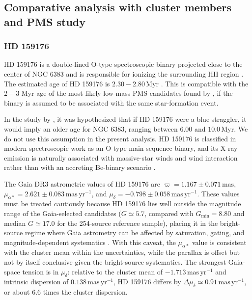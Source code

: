 \documentclass{aa}
\begin{document}
\subsection{Comparative analysis with cluster members and PMS study}
\subsubsection{HD 159176}
HD 159176 is a double-lined O-type spectroscopic binary projected close to the center of NGC 6383 and is responsible for ionizing the surrounding HII region \citep{1993Obs...113..204S,2007A&A...474..193L,2016ApJ...832..211P}. The estimated age of HD 159176 is $2.30-2.80$\,Myr \citep{2010AA...511A..25R}. This is compatible with the $2-3$ Myr age of the most likely low-mass PMS candidates found by \citet{2010AA...511A..25R}, if the binary is assumed to be associated with the same star-formation event.

In the study by \citet{2018AA...610A..30A}, it was hypothesized that if HD 159176 were a blue straggler, it would imply an older age for NGC 6383, ranging between $6.00$ and $10.0$\,Myr. We do not use this assumption in the present analysis. HD 159176 is classified in modern spectroscopic work as an O-type main-sequence binary, and its X-ray emission is naturally associated with massive-star winds and wind interaction rather than with an accreting Be-binary scenario \citep{2003AA...407..925R,1993Obs...113..204S,2007A&A...474..193L,2016ApJ...832..211P}.

The Gaia DR3 astrometric values of HD 159176 are $\varpi = 1.167 \pm 0.071\,\mathrm{mas}$, $\mu_{\alpha*}=2.621 \pm 0.083\,\mathrm{mas\,yr^{-1}}$, and $\mu_{\delta}=-0.798 \pm 0.058\,\mathrm{mas\,yr^{-1}}$. These values must be treated cautiously because HD 159176 lies well outside the magnitude range of the Gaia-selected candidates ($G\simeq5.7$, compared with $G_{\min}=8.80$ and median $G\simeq17.0$ for the 254-source reference sample), placing it in the bright-source regime where Gaia astrometry can be affected by saturation, gating, and magnitude-dependent systematics \citep{2021A&A...649A...2L,2021A&A...649A...4L,2021A&A...649A.124C,2022A&A...657A.130M}. With this caveat, the $\mu_{\alpha*}$ value is consistent with the cluster mean within the uncertainties, while the parallax is offset but not by itself conclusive given the bright-source systematics. The strongest Gaia-space tension is in $\mu_{\delta}$: relative to the cluster mean of $-1.713\,\mathrm{mas\,yr^{-1}}$ and intrinsic dispersion of $0.138\,\mathrm{mas\,yr^{-1}}$, HD 159176 differs by $\Delta\mu_{\delta}\simeq0.91\,\mathrm{mas\,yr^{-1}}$, or about $6.6$ times the cluster dispersion.
\end{document}
